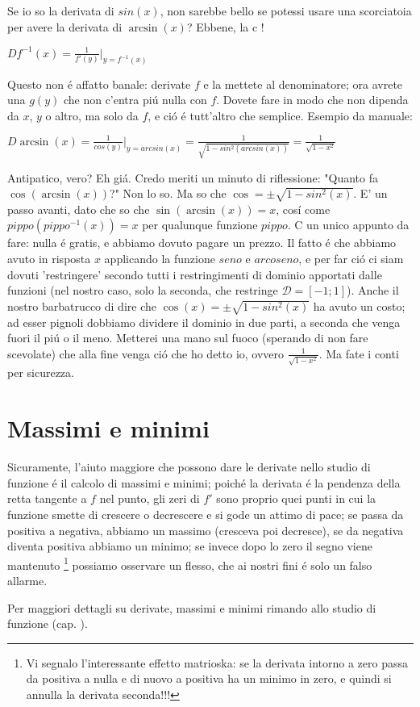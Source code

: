 Se io so la derivata di $sin(x)$, non sarebbe bello se potessi usare una scorciatoia per avere la derivata di $\arcsin(x)$? Ebbene, la c
!

$D f^{-1}(x) = \frac{1}{f'(y)} \bigg|_{y=f^{-1}(x)}$


Questo non \'e affatto banale: derivate $f$ e la mettete al denominatore; ora avrete una $g(y)$ che non c'entra pi\'u nulla con $f$. Dovete fare in modo che non dipenda da $x$, $y$ o altro, ma solo da $f$, e ci\'o \'e tutt'altro che semplice. Esempio da manuale:

$D \arcsin(x)= \frac{1}{cos(y)} \bigg|_{y=arcsin(x)}=\frac{1}{\sqrt{1-sin^2(arcsin(x))}}=\frac{1}{\sqrt{1-x^2}}$

Antipatico, vero? Eh gi\'a. Credo meriti un minuto di riflessione: "Quanto fa $\cos(\arcsin(x))$?" Non lo so. Ma so che $\cos = \pm \sqrt{1-sin^2(x)}$. E' un passo avanti, dato che so che $\sin(\arcsin(x))=x$, cos\'i come $pippo(pippo^{-1}(x))=x$ per qualunque funzione $pippo$. C
 un unico appunto da fare: nulla \'e gratis, e abbiamo dovuto pagare un prezzo. Il fatto \'e che abbiamo avuto in risposta $x$ applicando la funzione $seno$ e $arcoseno$, e per far ci\'o ci siam dovuti 'restringere' secondo tutti i restringimenti di dominio apportati dalle funzioni (nel nostro caso, solo la seconda, che restringe $\mathcal{D}=[-1;1]$). Anche il nostro barbatrucco di dire che $\cos(x)=\pm \sqrt{1-sin^2(x)}$ ha avuto un costo; ad esser pignoli dobbiamo dividere il dominio in due parti, a seconda che venga fuori il pi\'u o il meno. Metterei una mano sul fuoco (sperando di non fare scevolate) che alla fine venga ci\'o che ho detto io, ovvero  $\frac{1}{\sqrt{1-x^2}}$. Ma fate i conti per sicurezza.


\section{Massimi e minimi}

Sicuramente, l'aiuto maggiore che possono dare le derivate nello studio di funzione \'e il calcolo di massimi e minimi; poich\'e la derivata \'e la pendenza della retta tangente a $f$ nel punto, gli zeri di $f'$ sono proprio quei punti in cui la funzione smette di crescere o decrescere e si gode un attimo di pace; se passa da positiva a negativa, abbiamo un massimo (cresceva poi decresce), se da negativa diventa positiva abbiamo un minimo; se invece dopo lo zero il segno viene mantenuto \footnote{Vi segnalo l'interessante effetto matrioska: se la derivata intorno a zero passa da positiva a nulla e di nuovo a positiva ha un minimo in zero, e quindi si annulla la derivata seconda!!!} possiamo osservare un flesso, che ai nostri fini \'e solo un falso allarme.

Per maggiori dettagli su derivate, massimi e minimi rimando allo studio di funzione (cap. ).




